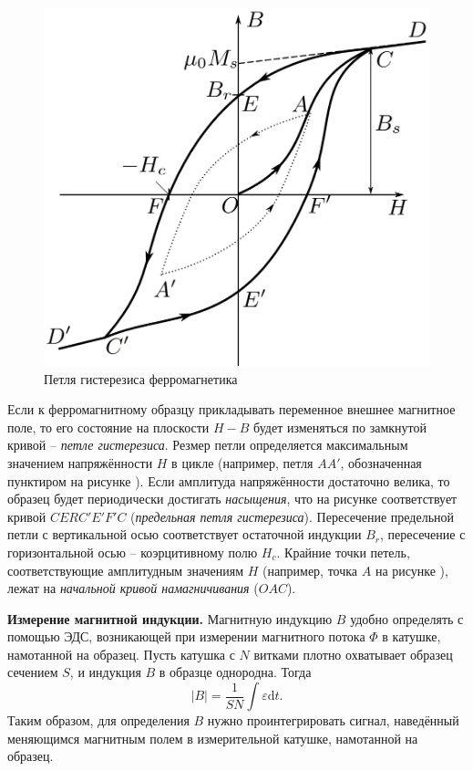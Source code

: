 \documentclass[a4paper,10pt]{article}
\begin{document}
\begin{figure}[h]
	\centering
	\includegraphics[scale=0.45]{Theor}
	\caption{Петля гистерезиса ферромагнетика} \label{Theor}
\end{figure}

Если к ферромагнитному образцу прикладывать переменное внешнее магнитное поле, то его состояние на плоскости $H-B$ будет изменяться по замкнутой кривой -- \textit{петле гистерезиса}. Резмер петли определяется максимальным значением напряжённости $H$ в цикле (например, петля $AA'$, обозначенная пунктиром на рисунке ). Если амплитуда напряжённости достаточно велика, то образец будет периодически достигать \textit{насыщения}, что на рисунке соответствует кривой $CERC'E'F'C$ (\textit{предельная петля гистерезиса}). Пересечение предельной петли с вертикальной осью соответствует остаточной индукции $B_r$, пересечение с горизонтальной осью -- коэрцитивному полю $H_c$. Крайние точки петель, соответствующие амплитудным значениям $H$ (например, точка $A$ на рисунке ), лежат на \textit{начальной кривой намагничивания} ($OAC$).

\textbf{Измерение магнитной индукции.} Магнитную индукцию $B$ удобно определять с помощью ЭДС, возникающей при измерении магнитного потока $\Phi$ в катушке, намотанной на образец. Пусть катушка с $N$ витками плотно охватывает образец сечением $S$, и индукция $B$ в образце однородна. Тогда\[\left|B\right|=\frac{1}{SN}\int\varepsilon\text{d}t.\]Таким образом, для определения $B$ нужно проинтегрировать сигнал, наведённый меняющимся магнитным полем в измерительной катушке, намотанной на образец.
\end{document}
